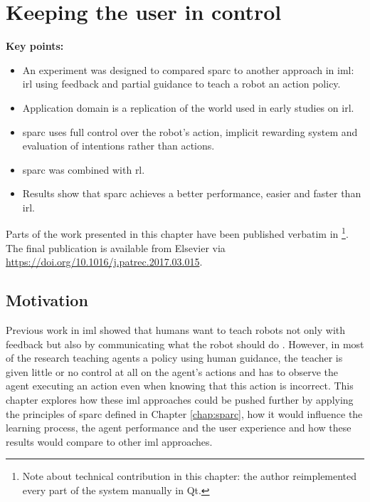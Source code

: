 \chapter{Keeping the user in control}\label{chap:control}

\graphicspath{{images/control/}}

\begin{framed}
	\textbf{Key points:}
	
	\begin{itemize}
		\item An experiment was designed to compared \gls{sparc} to another approach in \gls{iml}: \acrfull{irl} using feedback and partial guidance to teach a robot an action policy.
		\item Application domain is a replication of the world used in early studies on \acrshort{irl}.
		\item \gls{sparc} uses full control over the robot's action, implicit rewarding system and evaluation of intentions rather than actions.
		\item \gls{sparc} was combined with \acrlong{rl}.
		\item Results show that \gls{sparc} achieves a better performance, easier and faster than \acrshort{irl}.
	\end{itemize}
\end{framed}

Parts of the work presented in this chapter have been published verbatim in \cite{senft2017supervised} \footnote{Note about technical contribution in this chapter: the author reimplemented every part of the system manually in Qt.}. The final publication is available from Elsevier via \url{https://doi.org/10.1016/j.patrec.2017.03.015}.

\newpage
\section{Motivation}

Previous work in \gls{iml} showed that humans want to teach robots not only with feedback but also by communicating what the robot should do \citep{thomaz2008teachable}. However, in most of the research teaching agents a policy using human guidance, the teacher is given little or no control at all on the agent's actions and has to observe the agent executing an action even when knowing that this action is incorrect. This chapter explores how these \gls{iml} approaches could be pushed further by applying the principles of \gls{sparc} defined in Chapter \ref{chap:sparc}, how it would influence the learning process, the agent performance and the user experience and how these results would compare to other \gls{iml} approaches.

